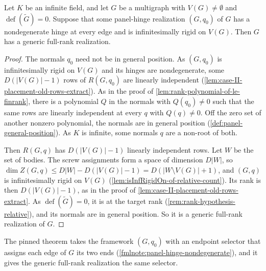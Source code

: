 \begin{lemma}
  \label{lem:generic-realization-of-rigid}
  \leanok
  Let $K$ be an infinite field, and let $G$ be a multigraph with
  $V(G) \neq \emptyset$ and $\operatorname{def}(\tilde G) = 0$. Suppose
  that some panel-hinge realization $(G, q_0)$ of $G$ has a
  nondegenerate hinge at every edge and is infinitesimally rigid on
  $V(G)$. Then $G$ has a generic full-rank realization.
\end{lemma}
\begin{proof}
  \leanok
  The normals $q_0$ need not be in general position. As $(G, q_0)$ is
  infinitesimally rigid on $V(G)$ and its hinges are nondegenerate, some
  $D(|V(G)| - 1)$ rows of $R(G, q_0)$ are linearly independent
  (\cref{lem:case-II-placement-old-rows-extract}).
  As in the proof of \cref{lem:rank-polynomial-of-le-finrank}, there is
  a polynomial $Q$ in the normals with $Q(q_0) \neq 0$ such that the same
  rows are linearly independent at every $q$ with $Q(q) \neq 0$. Off the
  zero set of another nonzero polynomial, the normals are in general
  position (\cref{def:panel-general-position}). As $K$ is infinite, some
  normals $q$ are a non-root of both.

  Then $R(G, q)$ has $D(|V(G)| - 1)$ linearly independent rows. Let $W$
  be the set of bodies. The screw assignments form a space of dimension
  $D|W|$, so
  $\dim Z(G, q) \le D|W| - D(|V(G)| - 1) = D(|W \setminus V(G)| + 1)$,
  and $(G, q)$ is infinitesimally rigid on $V(G)$
  (\cref{lem:isInfRigidOn-of-relative-count}). Its rank is then
  $D(|V(G)| - 1)$, as in the proof of
  \cref{lem:case-II-placement-old-rows-extract}. As
  $\operatorname{def}(\tilde G) = 0$, it is at the target rank
  (\cref{rem:rank-hypothesis-relative}), and its normals are in general
  position. So it is a generic full-rank realization of $G$.
\end{proof}
\begin{fmlnote}
  The pinned theorem takes the framework $(G, q_0)$ with an endpoint
  selector that assigns each edge of $G$ its two ends
  (\cref{fmlnote:panel-hinge-nondegenerate}), and it gives the generic
  full-rank realization the same selector.
\end{fmlnote}

